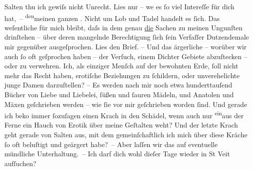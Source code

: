 \pstart
           Salten thu ich gewiſs nicht Unrecht. {\pb}Lies nur – we{\geminationn} es ſo viel Intereſſe für dich hat, – \substVorne{}\textsuperscript{den}\substDazwischen{}meinen\substHinten{} ganzen \label{K_L01338-2v}\label{K_L01338-2}. Nicht um Lob und Tadel handelt es ſich. Das weſentliche für mich bleibt,
               daſs in dem \label{K_L01338-3v}\label{K_L01338-3} genau \uline{die}{ }Sachen \introOben{}zu meinen Ungunſten\introOben{}
               drinſtehen – über deren mangelnde Berechtigung ſich ſein Verfaſſer Dutzendemale mir
               gegenüber ausgeſprochen. Lies den Brief. – Und das ärgerliche – worüber wir auch ſo
               oft geſprochen haben – der Verſuch, einem Dichter Gebiete abzuſtecken – oder zu
               verwehren. Ich, als einziger Menſch auf der bewohnten Erde, ſoll nicht mehr {\pb}das Recht haben,
               erotiſche Beziehungen zu ſchildern, oder unverehelichte junge Damen darzuſtellen? –
               Es werden nach mir noch etwa hunderttauſend Bücher von Liebe und Liebelei, ſüßen und ſauren Mädeln, und Anatolen und Mäxen geſchrieben
               werden – wie ſie vor mir geſchrieben worden ſind. Und gerade ich beko{\geminationm} immer ſozuſagen einen Krach in den Schädel, wenn auch
               nur \substVorne{}\textsuperscript{ein}\substDazwischen{}aus\substHinten{} der Ferne ein Hauch von Erotik über meine Geſtalten weht? {\pb}Und der letzte Krach
               geht gerade von Salten aus, mit dem
               gemeinſchaftlich ich mich über diese Kräche \introOben{}ſo oft\introOben{} beluſtigt
               und geärgert habe? – Aber laſſen wir das auf eventuelle mündliche Unterhaltung. – Ich
               darf dich wohl dieſer Tage wieder in St Veit
               aufſuchen?\pend
           
